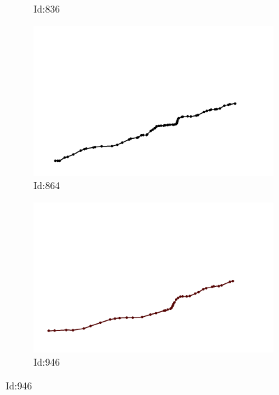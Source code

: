 \documentclass[12pt,twoside]{report}
\begin{document}
\begin{figure}
\begin{subfigure}[b]{0.20\textwidth}
\caption{Id:836}
\end{subfigure}
\begin{subfigure}[b]{0.20\textwidth}
\centering
\includegraphics[width=\textwidth]{../trajectories/864.png}
\caption{Id:864}
\end{subfigure}
\begin{subfigure}[b]{0.20\textwidth}
\centering
\includegraphics[width=\textwidth]{../trajectories/946.png}
\caption{Id:946}
\end{subfigure}
\end{figure}
\begin{figure}
\end{figure}
\end{document}
